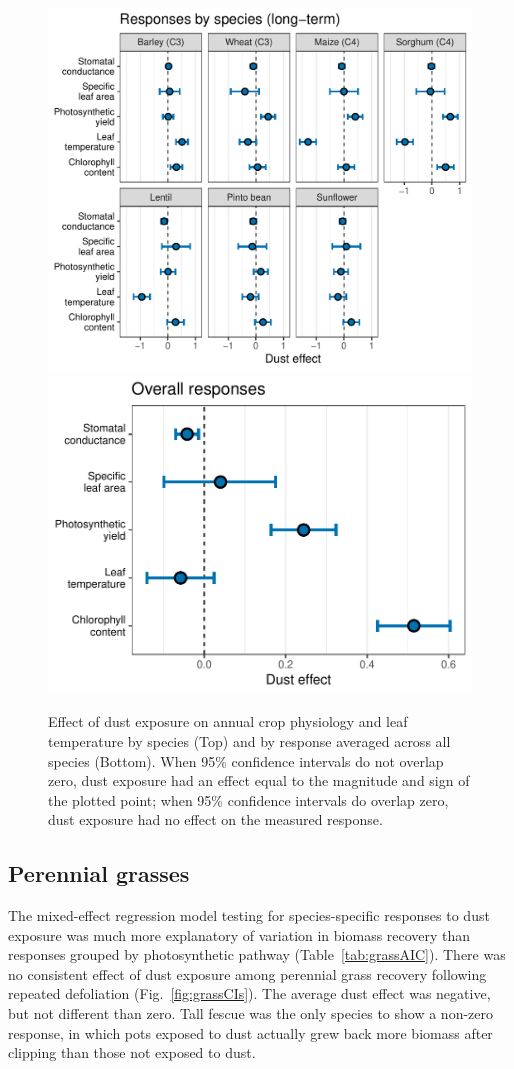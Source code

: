 \documentclass{svjour3}
\begin{document}
\begin{figure}
	 \hspace{0.5em}\includegraphics[width=0.8\linewidth]{lt_spp_gg-1}
	\includegraphics[width=0.75\linewidth]{lt_ov_gg-1}
  \caption{Effect of dust exposure on annual crop physiology and leaf temperature by species (Top) and by response averaged across all species (Bottom). 
  	When 95\% confidence intervals do not overlap zero, dust exposure had an effect equal to the magnitude and sign of the plotted point; when 95\% confidence intervals do overlap zero, dust exposure had no effect on the measured response. \label{fig:lt_cropCIs} }
\end{figure}

\subsection{Perennial grasses} 

The mixed-effect regression model testing for species-specific responses to dust exposure was much more explanatory of variation in biomass recovery than responses grouped by photosynthetic pathway (Table~\ref{tab:grassAIC}).
There was no consistent effect of dust exposure among perennial grass recovery following repeated defoliation (Fig.~\ref{fig:grassCIs}). 
The average dust effect was negative, but not different than zero. 
Tall fescue was the only species to show a non-zero response, in which pots exposed to dust actually grew back more biomass after clipping than those not exposed to dust. 
\end{document}
